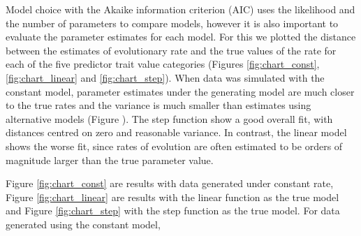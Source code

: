 Model choice with the Akaike information criterion (AIC) uses the likelihood and the number of parameters to compare models, however it is also important to evaluate the parameter estimates for each model. For this we plotted the distance between the estimates of evolutionary rate and the true values of the rate for each of the five predictor trait value categories (Figures \ref{fig:chart_const}, \ref{fig:chart_linear} and \ref{fig:chart_step}). When data was simulated with the constant model, parameter estimates under the generating model are much closer to the true rates and the variance is much smaller than estimates using alternative models (Figure ). The step function show a good overall fit, with distances centred on zero and reasonable variance. In contrast, the linear model shows the worse fit, since rates of evolution are often estimated to be orders of magnitude larger than the true parameter value.



Figure \ref{fig:chart_const} are results with data generated under constant rate, Figure \ref{fig:chart_linear} are results with the linear function as the true model and Figure \ref{fig:chart_step} with the step function as the true model. For data generated using the constant model, 


\pagebreak

